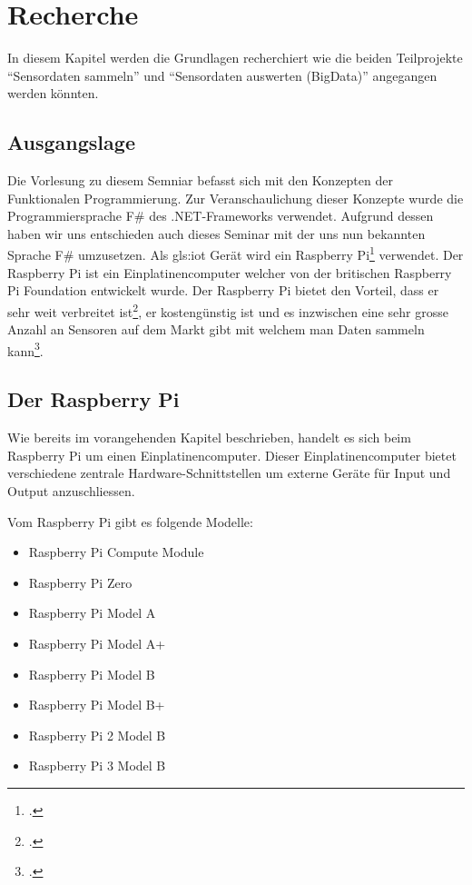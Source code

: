 
\chapter{Recherche}
In diesem Kapitel werden die Grundlagen recherchiert wie die beiden Teilprojekte "`Sensordaten sammeln"' und "`Sensordaten auswerten (BigData)"' angegangen werden könnten.

\section{Ausgangslage}
Die Vorlesung zu diesem Semniar befasst sich mit den Konzepten der Funktionalen Programmierung. Zur Veranschaulichung dieser Konzepte wurde die Programmiersprache F\# des .NET-Frameworks verwendet. Aufgrund dessen haben wir uns entschieden auch dieses Seminar mit der uns nun bekannten Sprache F\# umzusetzen. Als \Gls{gls:iot} Gerät wird ein Raspberry Pi\footcite{Raspberry_Pi_2016-04-24} verwendet. Der Raspberry Pi ist ein Einplatinencomputer welcher von der britischen Raspberry Pi Foundation entwickelt wurde. Der Raspberry Pi bietet den Vorteil, dass er sehr weit verbreitet ist\footcite{Raspberry_Pi_Erfolgsgeschichte_2016-04-24}, er kostengünstig ist und es inzwischen eine sehr grosse Anzahl an Sensoren auf dem Markt gibt mit welchem man Daten sammeln kann\footcite{Raspberry_Pi_Sensor_2016-04-24}.

\section{Der Raspberry Pi}
\label{sec:recherche:rpi}
Wie bereits im vorangehenden Kapitel beschrieben, handelt es sich beim Raspberry Pi um einen Einplatinencomputer. Dieser Einplatinencomputer bietet verschiedene zentrale Hardware-Schnittstellen um externe Geräte für Input und Output anzuschliessen.

Vom Raspberry Pi gibt es folgende Modelle:
\begin{itemize}
\item Raspberry Pi Compute Module
\item Raspberry Pi Zero
\item Raspberry Pi Model A
\item Raspberry Pi Model A+
\item Raspberry Pi Model B
\item Raspberry Pi Model B+
\item Raspberry Pi 2 Model B
\item Raspberry Pi 3 Model B
\end{itemize}

